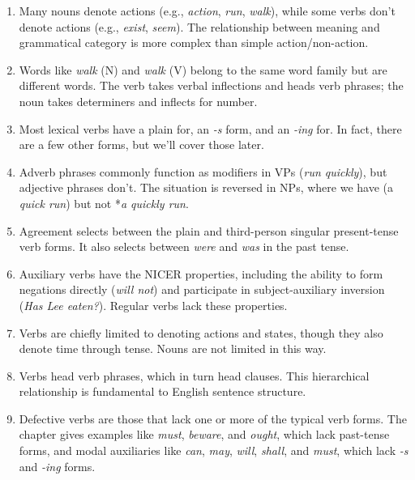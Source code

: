 \begin{tcolorbox}[title=Answer Key, colback=white, colframe=black, coltitle=black, fonttitle=\bfseries, colbacktitle=gray!10!white]

\begin{enumerate}[noitemsep]
    \item Many nouns denote actions (e.g., \textit{action}, \textit{run}, \textit{walk}), while some verbs don't denote actions (e.g., \textit{exist}, \textit{seem}). The relationship between meaning and grammatical category is more complex than simple action/non-action.
    
    \item Words like \textit{walk} (N) and \textit{walk} (V) belong to the same word family but are different words. The verb takes verbal inflections and heads verb phrases; the noun takes determiners and inflects for number.
    
    \item Most lexical verbs have a plain for, an \textit{-s} form, and an \textit{-ing} for. In fact, there are a few other forms, but we'll cover those later.
    
    \item Adverb phrases commonly function as modifiers in VPs (\textit{run quickly}), but adjective phrases don't. The situation is reversed in NPs, where we have (a \textit{quick run}) but not *\textit{a quickly run}.
    
    \item Agreement selects between the plain and third-person singular present-tense verb forms. It also selects between \textit{were} and \textit{was} in the past tense.
    
    \item Auxiliary verbs have the NICER properties, including the ability to form negations directly (\textit{will not}) and participate in subject-auxiliary inversion (\textit{Has Lee eaten?}). Regular verbs lack these properties.
    
    \item Verbs are chiefly limited to denoting actions and states, though they also denote time through tense. Nouns are not limited in this way.
    
    \item Verbs head verb phrases, which in turn head clauses. This hierarchical relationship is fundamental to English sentence structure.
    
    \item Defective verbs are those that lack one or more of the typical verb forms. The chapter gives examples like \textit{must}, \textit{beware}, and \textit{ought}, which lack past-tense forms, and modal auxiliaries like \textit{can}, \textit{may}, \textit{will}, \textit{shall}, and \textit{must}, which lack \textit{-s} and \textit{-ing} forms.
\end{enumerate}

\end{tcolorbox}

